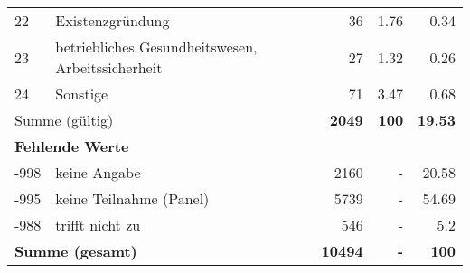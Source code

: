 \begin{longtable}{lXrrr}
        22 & \multicolumn{1}{X}{Existenzgründung} & %
          \num{36} &
          \num[round-mode=places,round-precision=2]{1,76} &
          \num[round-mode=places,round-precision=2]{0,34} \\

        23 & \multicolumn{1}{X}{betriebliches Gesundheitswesen, Arbeitssicherheit} & %
          \num{27} &
          \num[round-mode=places,round-precision=2]{1,32} &
          \num[round-mode=places,round-precision=2]{0,26} \\

        24 & \multicolumn{1}{X}{Sonstige} & %
          \num{71} &
          \num[round-mode=places,round-precision=2]{3,47} &
          \num[round-mode=places,round-precision=2]{0,68} \\

     \midrule
     \multicolumn{2}{l}{Summe (gültig)} &
       \textbf{\num{2049}} &
     \textbf{100} &
       \textbf{\num[round-mode=places,round-precision=2]{19,53}} \\
     \multicolumn{5}{l}{\textbf{Fehlende Werte}}\\
       -998 &
       keine Angabe &
         \num{2160} &
        - &
         \num[round-mode=places,round-precision=2]{20,58} \\
       -995 &
       keine Teilnahme (Panel) &
         \num{5739} &
        - &
         \num[round-mode=places,round-precision=2]{54,69} \\
       -988 &
       trifft nicht zu &
         \num{546} &
        - &
         \num[round-mode=places,round-precision=2]{5,2} \\
     \midrule
     \multicolumn{2}{l}{\textbf{Summe (gesamt)}} &
          \textbf{\num{10494}} &
        \textbf{-} &
        \textbf{100} \\
     \bottomrule
     \end{longtable}
     
